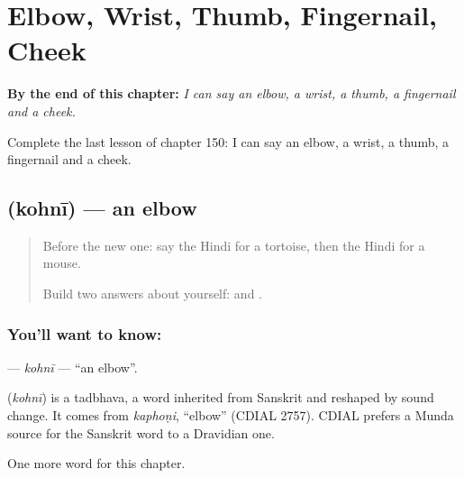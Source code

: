 
\chapter{Elbow, Wrist, Thumb, Fingernail, Cheek}
\label{ch:hi-elbow-wrist-thumb-fingernail-cheek}

\begin{chapteropening}
\textbf{By the end of this chapter:} \emph{I can say an elbow, a wrist, a thumb, a fingernail and a cheek.}

Complete the last lesson of chapter 150: I can say an elbow, a wrist, a thumb, a fingernail and a cheek.
\end{chapteropening}

\section[\texorpdfstring{\hi{कोहनी} (kohnī)}{कोहनी (kohnī)}]{ (kohnī) — an elbow}

\label{lesson:HI-C150-kohni}



\begin{quote}
Before the new one: say the Hindi for a tortoise, then the Hindi for a mouse.

Build two answers about yourself: \textbf{   } and \textbf{    }.
\end{quote}

\subsection*{You'll want to know: }
\textbf{} — \emph{kohnī} — \textquotedblleft{}an elbow\textquotedblright{}.

\begin{cousinweb}
\textbf{} (\emph{kohnī}) is a tadbhava, a word inherited from Sanskrit and reshaped by sound change. It comes from \emph{kaphoṇi}, \textquotedblleft{}elbow\textquotedblright{} (CDIAL 2757). CDIAL prefers a Munda source for the Sanskrit word to a Dravidian one.
\end{cousinweb}

\begin{grammarlens}[title={What you've built}]
One more word for this chapter.
\end{grammarlens}

